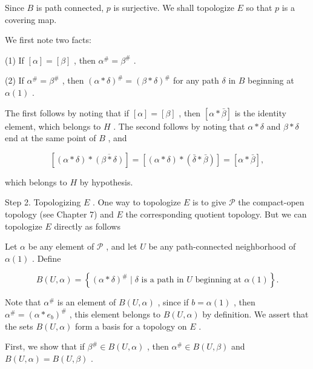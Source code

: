 Since \(B\) is path connected, \(p\) is surjective. We shall topologize \(E\) so that \(p\) is a covering map.

We first note two facts:

(1) If \(\left\lbrack  \alpha \right\rbrack   = \left\lbrack  \beta \right\rbrack\) , then \({\alpha }^{\# } = {\beta }^{\# }\) .

(2) If \({\alpha }^{\# } = {\beta }^{\# }\) , then \({\left( \alpha  * \delta \right) }^{\# } = {\left( \beta  * \delta \right) }^{\# }\) for any path \(\delta\) in \(B\) beginning at \(\alpha \left( 1\right)\) .

The first follows by noting that if \(\left\lbrack  \alpha \right\rbrack   = \left\lbrack  \beta \right\rbrack\) , then \(\left\lbrack  {\alpha  * \bar{\beta }}\right\rbrack\) is the identity element, which belongs to \(H\) . The second follows by noting that \(\alpha  * \delta\) and \(\beta  * \delta\) end at the same point of \(B\) , and

\[
\left\lbrack  {\left( {\alpha  * \delta }\right)  * \overline{\left( \beta  * \delta \right) }}\right\rbrack   = \left\lbrack  {\left( {\alpha  * \delta }\right)  * \left( {\bar{\delta } * \bar{\beta }}\right) }\right\rbrack   = \left\lbrack  {\alpha  * \bar{\beta }}\right\rbrack  ,
\]

which belongs to \(H\) by hypothesis.

Step 2. Topologizing \(E\) . One way to topologize \(E\) is to give \(\mathcal{P}\) the compact-open topology (see Chapter 7) and \(E\) the corresponding quotient topology. But we can topologize \(E\) directly as follows

Let \(\alpha\) be any element of \(\mathcal{P}\) , and let \(U\) be any path-connected neighborhood of \(\alpha \left( 1\right)\) . Define

\[
B\left( {U,\alpha }\right)  = \left\{  {{\left( \alpha  * \delta \right) }^{\# } \mid  \delta \text{ is a path in }U\text{ beginning at }\alpha \left( 1\right) }\right\}  .
\]

Note that \({\alpha }^{\# }\) is an element of \(B\left( {U,\alpha }\right)\) , since if \(b = \alpha \left( 1\right)\) , then \({\alpha }^{\# } = {\left( \alpha  * {e}_{b}\right) }^{\# }\) , this element belongs to \(B\left( {U,\alpha }\right)\) by definition. We assert that the sets \(B\left( {U,\alpha }\right)\) form a basis for a topology on \(E\) .

First, we show that if \({\beta }^{\# } \in  B\left( {U,\alpha }\right)\) , then \({\alpha }^{\# } \in  B\left( {U,\beta }\right)\) and \(B\left( {U,\alpha }\right)  = B\left( {U,\beta }\right)\) .

